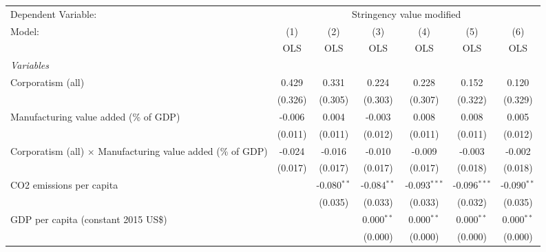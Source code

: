
\begingroup
\centering
\begin{tabular}{lcccccc}
   \toprule
   Dependent Variable: & \multicolumn{6}{c}{Stringency value modified}\\
   Model:                                                             & (1)     & (2)           & (3)           & (4)            & (5)            & (6)\\  
                                                                      &  OLS    & OLS           & OLS           & OLS            & OLS            & OLS\\  
   \midrule
   \emph{Variables}\\
   Corporatism (all)                                                  & 0.429   & 0.331         & 0.224         & 0.228          & 0.152          & 0.120\\   
                                                                      & (0.326) & (0.305)       & (0.303)       & (0.307)        & (0.322)        & (0.329)\\   
   Manufacturing value added (\% of GDP)                              & -0.006  & 0.004         & -0.003        & 0.008          & 0.008          & 0.005\\   
                                                                      & (0.011) & (0.011)       & (0.012)       & (0.011)        & (0.011)        & (0.012)\\   
   Corporatism (all) $\times$ Manufacturing value added (\% of GDP)   & -0.024  & -0.016        & -0.010        & -0.009         & -0.003         & -0.002\\   
                                                                      & (0.017) & (0.017)       & (0.017)       & (0.017)        & (0.018)        & (0.018)\\   
   CO2 emissions per capita                                           &         & -0.080$^{**}$ & -0.084$^{**}$ & -0.093$^{***}$ & -0.096$^{***}$ & -0.090$^{**}$\\   
                                                                      &         & (0.035)       & (0.033)       & (0.033)        & (0.032)        & (0.035)\\   
   GDP per capita (constant 2015 US\$)                                &         &               & 0.000$^{**}$  & 0.000$^{**}$   & 0.000$^{**}$   & 0.000$^{**}$\\   
                                                                      &         &               & (0.000)       & (0.000)        & (0.000)        & (0.000)\\   

\end{tabular}
